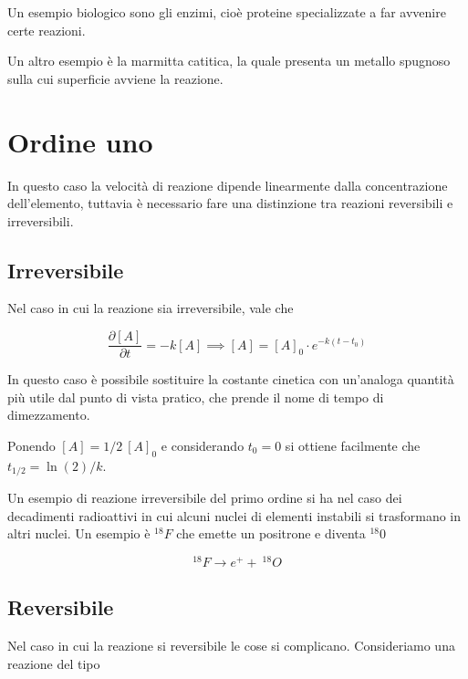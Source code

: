 Un esempio biologico sono gli enzimi, cioè proteine specializzate a far avvenire certe reazioni. 

Un altro esempio è la marmitta catitica, la quale presenta un metallo spugnoso sulla cui superficie avviene la reazione. 

\newpage

\section{Ordine uno}

In questo caso la velocità di reazione dipende linearmente dalla concentrazione dell'elemento, tuttavia è necessario fare una distinzione tra reazioni reversibili e irreversibili.

\subsection{Irreversibile}

Nel caso in cui la reazione sia irreversibile, vale che 

\begin{equation}
    \frac{\partial [A]}{\partial t} = - k [A] \implies [A] = [A]_0 \cdot e^{-k(t - t_0)}
    \label{ordine_uno_irr}
\end{equation}

In questo caso è possibile sostituire la costante cinetica con un'analoga quantità più utile dal punto di vista pratico, che prende il nome di tempo di dimezzamento. 

Ponendo $[A] = 1/2 \ [A]_0$ e considerando $t_0 = 0$ si ottiene facilmente che $t_{1/2} = \ln(2)/k$.

Un esempio di reazione irreversibile del primo ordine si ha nel caso dei decadimenti radioattivi in cui alcuni nuclei di elementi instabili si trasformano in altri nuclei. Un esempio è $^{18} F$ che emette un positrone e diventa $^{18} 0$

\begin{equation}
    ^{18} F \to e^{+} + \ ^{18}O 
\end{equation}

\subsection{Reversibile}

Nel caso in cui la reazione si reversibile le cose si complicano. Consideriamo una reazione del tipo 

